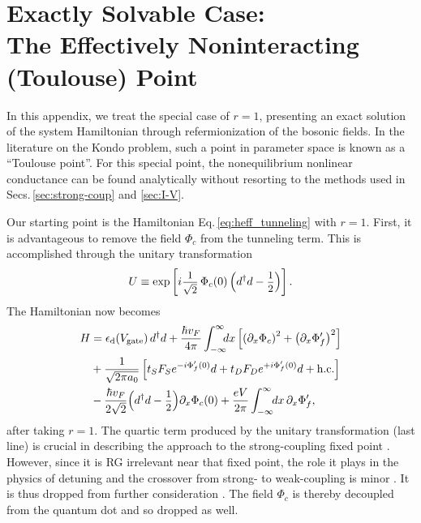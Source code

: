 \documentclass[aps,prb,reprint,floatfix,superscriptaddress,amssymb,amsmath]{revtex4-2}
\newcommand{\Vg}{V_\text{gate}}
\newcommand{\sdfrac}[2]{\mbox{\small$\displaystyle\frac{#1}{#2}$}}
\begin{document}
\section{Exactly Solvable Case:\\The Effectively Noninteracting (Toulouse) Point}
\label{sec:toulouse-point}

In this appendix, we treat the special case of $r \!=\! 1$, presenting an exact solution of the system Hamiltonian through refermionization of the bosonic fields. In the literature on the Kondo problem, such a point in parameter space is known as a ``Toulouse point''. For this special point, the nonequilibrium nonlinear conductance can be found analytically without resorting to the methods used in Secs.\,\ref{sec:strong-coup} and \ref{sec:I-V}.

Our starting point is the Hamiltonian Eq.\,\eqref{eq:heff_tunneling} with $r\!=\!1$. First, it is advantageous to remove the field $\Phi_c$ from the tunneling term. This is accomplished through the unitary transformation
\begin{equation}
U \equiv \exp\left[i \sdfrac{1}{\sqrt{2}} \,\Phi_c(0)\, \Big(d^{\dagger} d - \sdfrac{1}{2}\Big) \right] .
\label{eq:unitary_transformation_of_coefficients}
\end{equation}
The Hamiltonian now becomes 
\begin{align}
 H &=  \epsilon_\text{d}(\Vg) \,d^\dagger d 
 + \frac{\hbar v_{F}}{4\pi}\int_{-\infty}^{\infty} \!\!\!dx
 \left[\left(\partial_{x}\Phi_{c}\right)^{2}+\left(\partial_{x}\Phi_{f}'\right)^{2}\right]  \notag\\
& + \frac{1}{\sqrt{2\pi a_0}} \left[ t_S F_{S} e^{-i \Phi_f'(0)} d + t_D F_{D} e^{+i \Phi_f'(0)} d + \text{h.c.} \right] \notag\\
& -\frac{\hbar v_F}{2\sqrt{2}} \Big(d^{\dagger} d - \sdfrac{1}{2}\Big) \partial_x\Phi_c(0) + \frac{eV}{2\pi} \int_{-\infty}^{\infty} \!\!dx\, \partial_x \Phi_f',
\label{eq:toulouse_after_rotation}
\end{align}
after taking $r\!=\!1$.
The quartic term  produced by the unitary transformation (last line) is crucial in describing the approach to the strong-coupling fixed point \cite{Zheng1-GPRB14}. However, since it is RG irrelevant near that fixed point, the role it plays in the physics of detuning and the crossover from strong- to weak-coupling  is minor \cite{KaneFisherPRB92,GogolinBook,Zheng1-GPRB14,MitchellSelaPRL16}. It is thus dropped from further consideration \cite{note-K1quartic}. The field $\Phi_c$ is thereby decoupled from the quantum dot and so dropped as well.
\end{document}
